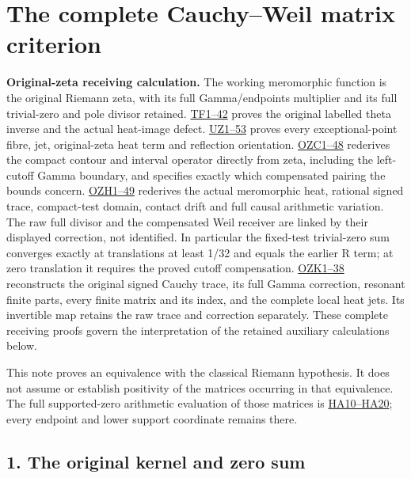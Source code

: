 \documentclass[
  10pt,
  a4paper,
]{article}
\author{}
\date{}
\begin{document}
{
\setcounter{tocdepth}{3}
\tableofcontents
}
\section{The complete Cauchy--Weil matrix
criterion}\label{the-complete-cauchyweil-matrix-criterion}

\textbf{Original-zeta receiving calculation.} The working meromorphic
function is the original Riemann zeta, with its full Gamma/endpoints
multiplier and its full trivial-zero and pole divisor retained.
\href{FAITHFUL_THETA_COMPLETION_RETURN.md}{TF1--42} proves the original
labelled theta inverse and the actual heat-image defect.
\href{FAITHFUL_UNCOMPLETED_ZETA_HEAT.md}{UZ1--53} proves every
exceptional-point fibre, jet, original-zeta heat term and reflection
orientation.
\href{ORIGINAL_ZETA_COMPACT_WEIL_RECONSTRUCTION.md}{OZC1--48} rederives
the compact contour and interval operator directly from zeta, including
the left-cutoff Gamma boundary, and specifies exactly which compensated
pairing the bounds concern.
\href{ORIGINAL_ZETA_HEAT_CONTACT_RECONSTRUCTION.md}{OZH1--49} rederives
the actual meromorphic heat, rational signed trace, compact-test domain,
contact drift and full causal arithmetic variation. The raw full divisor
and the compensated Weil receiver are linked by their displayed
correction, not identified. In particular the fixed-test trivial-zero
sum converges exactly at translations at least 1/32 and equals the
earlier R term; at zero translation it requires the proved cutoff
compensation. \href{ORIGINAL_ZETA_CAUCHY_RECONSTRUCTION.md}{OZK1--38}
reconstructs the original signed Cauchy trace, its full Gamma
correction, resonant finite parts, every finite matrix and its index,
and the complete local heat jets. Its invertible map retains the raw
trace and correction separately. These complete receiving proofs govern
the interpretation of the retained auxiliary calculations below.

This note proves an equivalence with the classical Riemann hypothesis.
It does not assume or establish positivity of the matrices occurring in
that equivalence. The full supported-zero arithmetic evaluation of those
matrices is \href{HEAT_CAUCHY_ARITHMETIC_DERIVATION.md}{HA10--HA20};
every endpoint and lower support coordinate remains there.

\subsection{1. The original kernel and zero
sum}\label{the-original-kernel-and-zero-sum}
\end{document}
